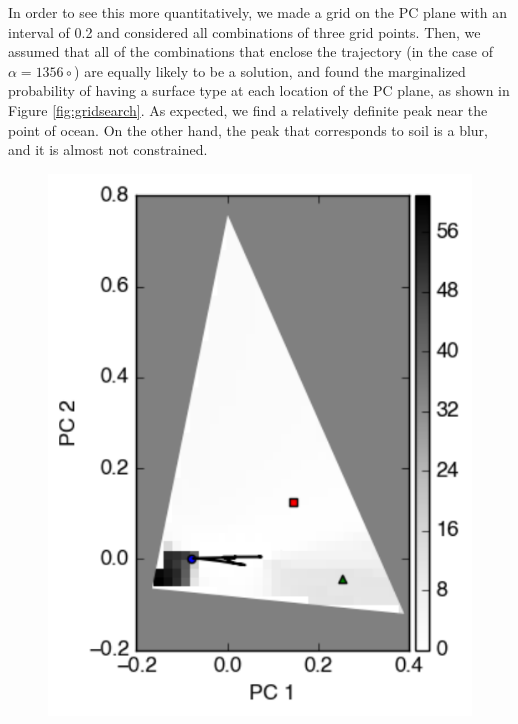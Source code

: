 \documentclass[iop,numberedappendix,apj,]{emulateapj}
\begin{document}
In order to see this more quantitatively, we made a grid on the PC plane  with an interval of 0.2 and considered all combinations of three grid points. 
Then, we assumed that all of the combinations that enclose the trajectory (in the case of $\alpha = 1356{\circ }$) are equally likely to be a solution, and found the marginalized probability of having a surface type at each location of the PC plane, as shown in Figure \ref{fig:gridsearch}. 
%
As expected, we find a relatively definite peak near the point of ocean. 
On the other hand, the peak that corresponds to soil is a blur, and it is almost not constrained. 

\begin{figure}[tbh!]
    \begin{center}
\includegraphics[width=\hsize]{mockdata_90deg_3types_t12_lc_noreg.pdf}

\end{center}
\end{figure}
\end{document}
